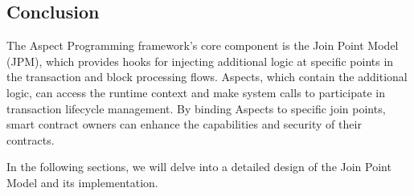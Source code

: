 \subsection{Conclusion}
The Aspect Programming framework's core component is the Join Point Model (JPM), which provides hooks for injecting additional logic at specific points in the transaction and block processing flows. Aspects, which contain the additional logic, can access the runtime context and make system calls to participate in transaction lifecycle management. By binding Aspects to specific join points, smart contract owners can enhance the capabilities and security of their contracts.

In the following sections, we will delve into a detailed design of the Join Point Model and its implementation.
